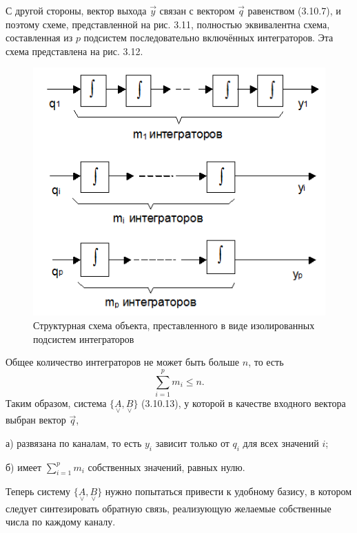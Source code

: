 С другой стороны, вектор выхода $\vec{y}$ связан с вектором $\vec{q}$ равенством (3.10.7), и поэтому схеме, представленной на рис. 3.11, полностью эквивалентна схема, составленная из $p$ подсистем последовательно включённых интеграторов. Эта схема представлена на рис. 3.12.
\begin{figure}[H]
	\centering
	\includegraphics[scale=0.9]{images/Fig3_12}
	\caption{Структурная схема объекта, преставленного в виде изолированных подсистем интеграторов}
\end{figure}
Общее количество интеграторов не может быть больше $n$, то есть
\begin{equation*}
	\sum_{i=1}^{p}m_i\leq n.
\end{equation*}
Таким образом, система $\{\underset{\lor}{A},\underset{\lor}{B}\}$ (3.10.13), у которой в качестве входного вектора выбран вектор $\vec{q}$,

а) развязана по каналам, то есть $y_i$ зависит только от $q_i$ для всех значений $i$;

б) имеет $\sum_{i=1}^{p}m_i$ собственных значений, равных нулю.

Теперь систему $\{\underset{\lor}{A},\underset{\lor}{B}\}$ нужно попытаться привести к удобному базису, в котором следует синтезировать обратную связь, реализующую желаемые собственные числа по каждому каналу.

